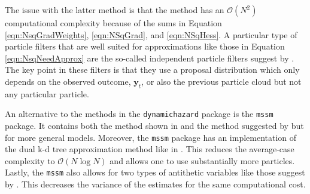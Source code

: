 \documentclass[notitlepage]{article}
\renewcommand{\vec}[1]{\bm{#1}}
\newcommand{\Lparen}[1]{\left( #1\right)}
\newcommand{\bigO}[1]{\mathcal{O}\Lparen{#1}}
\newcommand{\nPart}{N}
\begin{document}
The issue with the latter method is that the method has an $\bigO{\nPart^2}$ 
computational complexity because of the sums in Equation \eqref{eqn:NsqGradWeights}, 
\eqref{eqn:NSqGrad}, and \eqref{eqn:NSqHess}. A particular type of particle filters
that are well suited for approximations like those in Equation \eqref{eqn:NsqNeedApprox}
are the so-called independent particle filters
suggest by \cite{Lin05}. The key point in these filters is that they 
use a proposal distribution 
which only depends on the observed outcome, $\vec y_t$, or also the previous particle 
cloud but not any particular particle. 

An alternative to the methods in the \texttt{dynamichazard} package is the \texttt{mssm} package. It contains 
both the method shown in \cite{cappe05} and the method suggested by \cite{poyiadjis11} but for more general 
models. Moreover, the \texttt{mssm} package has an implementation of the dual k-d tree approximation method like in 
\cite{klaas06}. This reduces the average-case complexity to $\bigO{\nPart\log\nPart}$ and allows one 
to use substantially more particles. Lastly, the \texttt{mssm} also allows for two types of 
antithetic variables like those suggest by \cite{Durbin97}. This decreases the variance of the estimates for 
the same computational cost.


\newpage


\end{document}
